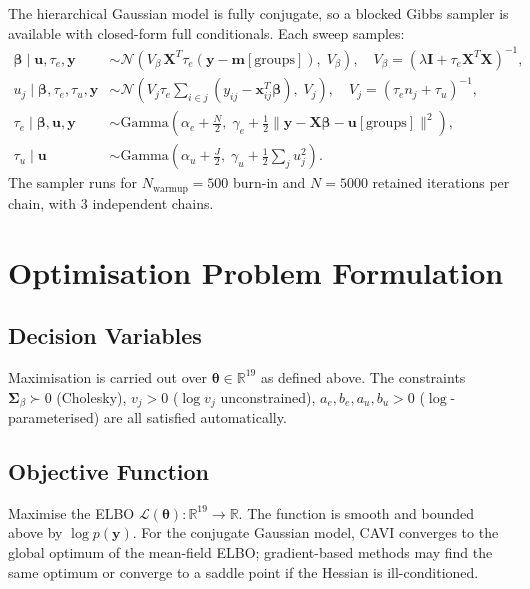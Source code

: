 \documentclass[11pt,a4paper]{article}
\newcommand{\R}{\mathbb{R}}
\begin{document}
The hierarchical Gaussian model is fully conjugate, so a blocked Gibbs sampler is
available with closed-form full conditionals.
Each sweep samples:
\begin{align}
  \bm{\beta} \mid \mathbf{u}, \tau_e, \mathbf{y}
    &\sim \mathcal{N}(V_\beta\,\bm{X}^T\tau_e(\mathbf{y}-\bm{m}[\mathrm{groups}]),\; V_\beta),
    \quad V_\beta = (\lambda\bm{I} + \tau_e\bm{X}^T\bm{X})^{-1},\\
  u_j \mid \bm{\beta}, \tau_e, \tau_u, \mathbf{y}
    &\sim \mathcal{N}(V_j\tau_e\!\sum_{i\in j}(y_{ij} - \mathbf{x}_{ij}^T\bm{\beta}),\; V_j),
    \quad V_j = (\tau_e n_j + \tau_u)^{-1},\\
  \tau_e \mid \bm{\beta}, \mathbf{u}, \mathbf{y}
    &\sim \mathrm{Gamma}\!\left(\alpha_e + \tfrac{N}{2},\;
      \gamma_e + \tfrac{1}{2}\|\mathbf{y}-\bm{X}\bm{\beta}-\mathbf{u}[\mathrm{groups}]\|^2\right),\\
  \tau_u \mid \mathbf{u}
    &\sim \mathrm{Gamma}\!\left(\alpha_u + \tfrac{J}{2},\;
      \gamma_u + \tfrac{1}{2}\sum_j u_j^2\right).
\end{align}
The sampler runs for $N_{\mathrm{warmup}} = 500$ burn-in and $N = 5000$ retained
iterations per chain, with 3 independent chains.

\section{Optimisation Problem Formulation}

\subsection*{Decision Variables}

Maximisation is carried out over $\bm{\theta} \in \R^{19}$ as defined above.
The constraints $\bm{\Sigma}_\beta \succ 0$ (Cholesky), $v_j > 0$ ($\log v_j$
unconstrained), $a_e, b_e, a_u, b_u > 0$ ($\log$-parameterised) are all
satisfied automatically.

\subsection*{Objective Function}

Maximise the ELBO $\mathcal{L}(\bm{\theta}):\R^{19}\to\R$.
The function is smooth and bounded above by $\log p(\mathbf{y})$.
For the conjugate Gaussian model, CAVI converges to the global optimum of the
mean-field ELBO; gradient-based methods may find the same optimum or converge
to a saddle point if the Hessian is ill-conditioned.
\end{document}
